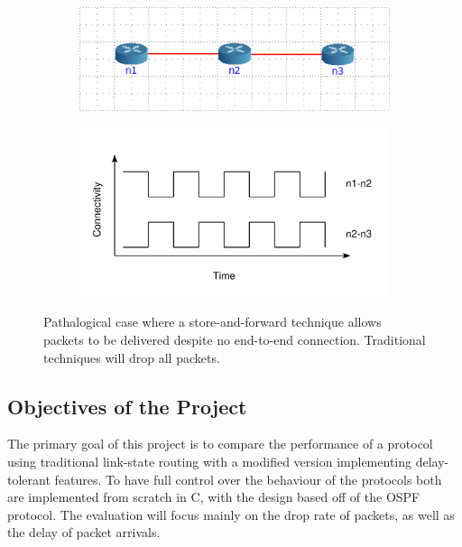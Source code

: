 \documentclass[10pt,twoside,a4paper]{article}
\begin{document}
\begin{figure}[H]
\centering
\begin{subfigure}{.45\textwidth}
  \centering
  \includegraphics[width=1\linewidth]{pathalogical_topology}
  \label{fig:pathalogical_topology}
\end{subfigure}%
\begin{subfigure}{.55\textwidth}
  \centering
  \includegraphics[width=1\linewidth]{pathalogical_graph}
  \label{fig:pathalogical_graph}
\end{subfigure}
\caption{Pathalogical case where a store-and-forward technique allows packets to be delivered despite no end-to-end connection. Traditional techniques will drop all packets.}
\label{fig:pathalogical}
\end{figure}

\subsection{Objectives of the Project}

The primary goal of this project is to compare the performance of a protocol using traditional link-state routing with a modified version implementing delay-tolerant features. To have full control over the behaviour of the protocols both are implemented from scratch in C, with the design based off of the OSPF protocol. The evaluation will focus mainly on the drop rate of packets, as well as the delay of packet arrivals.
\end{document}
